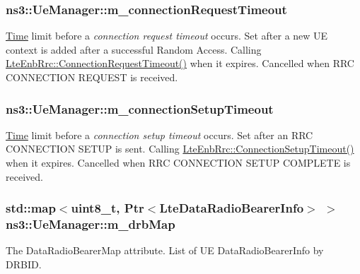 \subsubsection[{\texorpdfstring{m\+\_\+connection\+Request\+Timeout}{m_connectionRequestTimeout}}]{ ns3\+::\+Ue\+Manager\+::m\+\_\+connection\+Request\+Timeout\hspace{0.3cm}{\ttfamily [private]}}\hypertarget{classns3_1_1UeManager_a85948121037b466cea1baa6a51273def}{}\label{classns3_1_1UeManager_a85948121037b466cea1baa6a51273def}
\hyperlink{classns3_1_1Time}{Time} limit before a {\itshape connection request timeout} occurs. Set after a new UE context is added after a successful Random Access. Calling \hyperlink{classns3_1_1LteEnbRrc_ad7992d8a886b60ee953879d9b5d37dca}{Lte\+Enb\+Rrc\+::\+Connection\+Request\+Timeout()} when it expires. Cancelled when R\+RC C\+O\+N\+N\+E\+C\+T\+I\+ON R\+E\+Q\+U\+E\+ST is received. 
\subsubsection[{\texorpdfstring{m\+\_\+connection\+Setup\+Timeout}{m_connectionSetupTimeout}}]{ ns3\+::\+Ue\+Manager\+::m\+\_\+connection\+Setup\+Timeout\hspace{0.3cm}{\ttfamily [private]}}\hypertarget{classns3_1_1UeManager_afa30ea647e5d93b6c58d46b92e681044}{}\label{classns3_1_1UeManager_afa30ea647e5d93b6c58d46b92e681044}
\hyperlink{classns3_1_1Time}{Time} limit before a {\itshape connection setup timeout} occurs. Set after an R\+RC C\+O\+N\+N\+E\+C\+T\+I\+ON S\+E\+T\+UP is sent. Calling \hyperlink{classns3_1_1LteEnbRrc_ac0af0fbbf09bc66c0ebd5be00c69aa7c}{Lte\+Enb\+Rrc\+::\+Connection\+Setup\+Timeout()} when it expires. Cancelled when R\+RC C\+O\+N\+N\+E\+C\+T\+I\+ON S\+E\+T\+UP C\+O\+M\+P\+L\+E\+TE is received. 
\subsubsection[{\texorpdfstring{m\+\_\+drb\+Map}{m_drbMap}}]{\setlength{\rightskip}{0pt plus 5cm}std\+::map$<$uint8\+\_\+t, {\bf Ptr}$<${\bf Lte\+Data\+Radio\+Bearer\+Info}$>$ $>$ ns3\+::\+Ue\+Manager\+::m\+\_\+drb\+Map\hspace{0.3cm}{\ttfamily [private]}}\hypertarget{classns3_1_1UeManager_a18499c025730b63c73e5d93effff57aa}{}\label{classns3_1_1UeManager_a18499c025730b63c73e5d93effff57aa}
The {\ttfamily Data\+Radio\+Bearer\+Map} attribute. List of UE Data\+Radio\+Bearer\+Info by D\+R\+B\+ID. 

